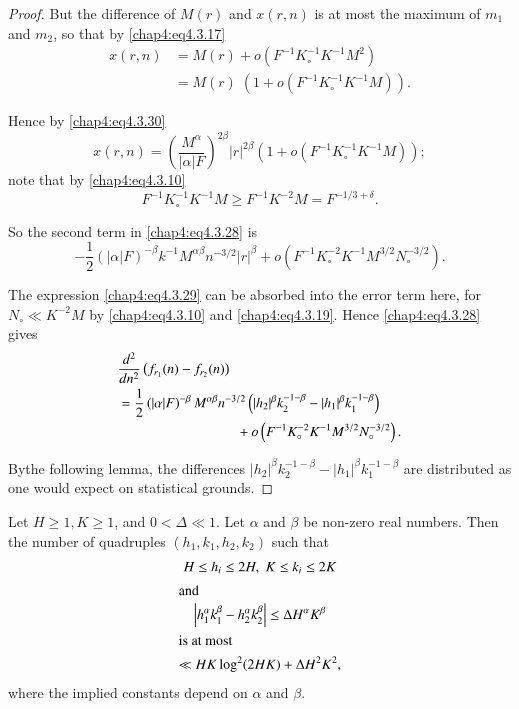 \begin{proof}
But the difference of $M(r)$ and $x(r,n)$ is at most the maximum  of $m_1$ and $m_2$, so that by \eqref{chap4:eq4.3.17}
\begin{align*}
x(r,n) &= M(r)+o\left(F^{-1}K_\circ^{-1}K^{-1}M^2\right)\\
&= M(r)\;\left(1+o\left(F^{-1}K_\circ^{-1}K^{-1}M\right)\right).
\end{align*}

Hence by \eqref{chap4:eq4.3.30}
$$
x(r,n)=\left(\frac{M^\alpha}{|\alpha|F}\right)^{2\beta}|r|^{2\beta}\left(1+o\left( F^{-1}K_\circ^{-1}K^{-1}M\right)\right);
$$
note that by \eqref{chap4:eq4.3.10}
$$
F^{-1}K_\circ^{-1}K^{-1}M\geq F^{-1}K^{-2}M=F^{-1/3+\delta}.
$$

So the second term in \eqref{chap4:eq4.3.28} is 
$$
-\frac{1}{2}\left(|\alpha|F\right)^{-\beta}k^{-1}M^{\alpha\beta}n^{-3/2}|r|^\beta+o
\left(F^{-1}K_\circ^{-2}K^{-1}M^{3/2}N_\circ^{-3/2}\right). 
$$

The expression \eqref{chap4:eq4.3.29} can be absorbed into the error term here, for $N_\circ\ll K^{-2}M$ by \eqref{chap4:eq4.3.10} and \eqref{chap4:eq4.3.19}. Hence \eqref{chap4:eq4.3.28} gives
\begin{align}
  &  \frac{d^2}{dn^2} \left(f_{r_1}(n)-f_{r_2} (n)
  \right) \label{chap4:eq4.3.31}\\  
  &= \frac{1}{2}\left(|\alpha|F\right)^{-\beta} M^{\alpha\beta}
  n^{-3/2} \left(|h_2|^\beta k_2^{-1-\beta}-|h_1 |^\beta
  k_1^{-1-\beta} \right)\notag\\
  & \hspace{3cm}+o \left(F^{-1}K_\circ^{-2} K^{-1}M^{3/2}
  N_\circ^{-3/2} \right).\notag
\end{align}

By\pageoriginale the following lemma, the differences $|h_2|^\beta k_2^{-1-\beta}- |h_1|^\beta k_1^{-1-\beta}$ are distributed as one would expect on statistical grounds.
\end{proof}

\begin{lem}\label{chap4:lem4.2}
Let $H\geq 1, K\geq 1$, and $0<\Delta\ll 1$. Let $\alpha$ and $\beta$ be non-zero real numbers. Then the number of quadruples $(h_1,k_1,h_2,k_2)$ such that 
\begin{gather}
H\leq h_i\leq 2H, \; K\leq k_i \leq 2K\label{chap4:eq4.3.32}\\
\intertext{and}
\left|h_1^\alpha k_1^\beta - h_2^\alpha k_2^\beta \right|\leq \Delta H^\alpha K^\beta\label{chap4:eq4.3.33}\\
\intertext{is at most}
\ll HK\log^2(2HK)+\Delta H^2K^2,\label{chap4:eq4.3.34}
\end{gather}
where the implied constants depend on $\alpha$ and $\beta$.
\end{lem}

